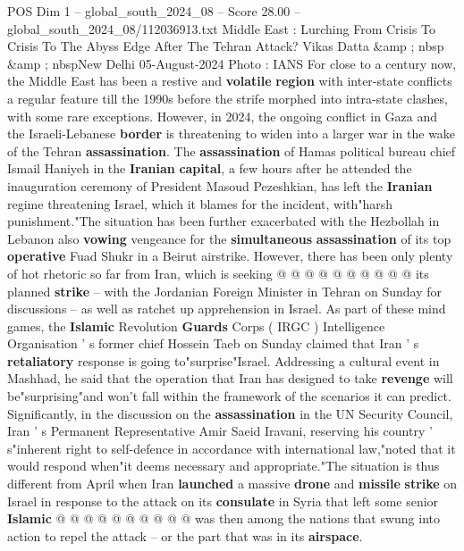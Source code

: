 \begin{textsample}{POS Dim 1 – global\_south\_2024\_08 – Score 28.00 – global\_south\_2024\_08/112036913.txt}  \label{ex:f1_pos_019}
Middle East : Lurching From Crisis To Crisis To The Abyss Edge After The Tehran Attack?
Vikas Datta \&amp ; nbsp \&amp ; nbspNew Delhi 05-August-2024 Photo : IANS For close to a century now, the Middle East has been a restive and \textbf{volatile} \textbf{region} with inter-state conflicts a regular feature till the 1990s before the strife morphed into intra-state clashes, with some rare exceptions.
However, in 2024, the ongoing conflict in Gaza and the Israeli-Lebanese \textbf{border} is threatening to widen into a larger war in the wake of the Tehran \textbf{assassination}.
The \textbf{assassination} of Hamas political bureau chief Ismail Haniyeh in the \textbf{Iranian} \textbf{capital}, a few hours after he attended the inauguration ceremony of President Masoud Pezeshkian, has left the \textbf{Iranian} regime threatening Israel, which it blames for the incident, with"harsh punishment."The situation has been further exacerbated with the Hezbollah in Lebanon also \textbf{vowing} vengeance for the \textbf{simultaneous} \textbf{assassination} of its top \textbf{operative} Fuad Shukr in a Beirut airstrike.
However, there has been only plenty of hot rhetoric so far from Iran, which is seeking @ @ @ @ @ @ @ @ @ @ its planned \textbf{strike} -- with the Jordanian Foreign Minister in Tehran on Sunday for discussions -- as well as ratchet up apprehension in Israel.
As part of these mind games, the \textbf{Islamic} Revolution \textbf{Guards} Corps ( IRGC ) Intelligence Organisation ' s former chief Hossein Taeb on Sunday claimed that Iran ' s \textbf{retaliatory} response is going to"surprise"Israel.
Addressing a cultural event in Mashhad, he said that the operation that Iran has designed to take \textbf{revenge} will be"surprising"and won't fall within the framework of the scenarios it can predict.
Significantly, in the discussion on the \textbf{assassination} in the UN Security Council, Iran ' s Permanent Representative Amir Saeid Iravani, reserving his country ' s"inherent right to self-defence in accordance with international law,"noted that it would respond when"it deems necessary and appropriate."The situation is thus different from April when Iran \textbf{launched} a massive \textbf{drone} and \textbf{missile} \textbf{strike} on Israel in response to the attack on its \textbf{consulate} in Syria that left some senior \textbf{Islamic} @ @ @ @ @ @ @ @ @ @ was then among the nations that swung into action to repel the attack -- or the part that was in its \textbf{airspace}.

\end{textsample}
